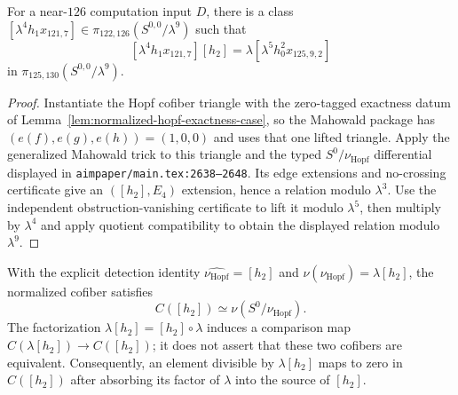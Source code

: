 \begin{lemma}
  \label{lem:near126-nu-extension}
  \notready
  For a near-$126$ computation input $D$, there is a class
  $[\lambda^4h_1x_{121,7}]\in
  \pi_{122,126}(S^{0,0}/\lambda^9)$ such that
  \[
    [\lambda^4h_1x_{121,7}][h_2]
       =\lambda[\lambda^5h_0^2x_{125,9,2}]
  \]
  in $\pi_{125,130}(S^{0,0}/\lambda^9)$.
\end{lemma}

\begin{proof}
  Instantiate the Hopf cofiber triangle with the zero-tagged exactness datum
  of Lemma~\ref{lem:normalized-hopf-exactness-case}, so the Mahowald package
  has $(e(f),e(g),e(h))=(1,0,0)$ and uses that one lifted triangle.  Apply the
  generalized Mahowald trick to this triangle and the
  typed $S^0/\nu_{\mathrm{Hopf}}$ differential
  displayed in \texttt{aimpaper/main.tex:2638--2648}.  Its edge extensions and
  no-crossing certificate give an $([h_2],E_4)$ extension, hence a relation
  modulo $\lambda^3$.  Use the independent obstruction-vanishing certificate
  to lift it modulo $\lambda^5$, then multiply by $\lambda^4$ and apply quotient
  compatibility to obtain the displayed relation modulo $\lambda^9$.
\end{proof}

\begin{proposition}
  \label{prop:synthetic-hopf-cofiber-equivalence}
  \notready
  With the explicit detection identity
  $\widehat{\nu_{\mathrm{Hopf}}}=[h_2]$ and
  $\nu(\nu_{\mathrm{Hopf}})=\lambda[h_2]$, the normalized cofiber satisfies
  \[
    C([h_2])\simeq\nu(S^0/\nu_{\mathrm{Hopf}}).
  \]
  The factorization $\lambda[h_2]=[h_2]\circ\lambda$ induces a comparison map
  $C(\lambda[h_2])\to C([h_2])$; it does not assert that these two cofibers are
  equivalent.  Consequently, an element divisible by $\lambda[h_2]$ maps to
  zero in $C([h_2])$ after absorbing its factor of $\lambda$ into the source of
  $[h_2]$.
\end{proposition}

